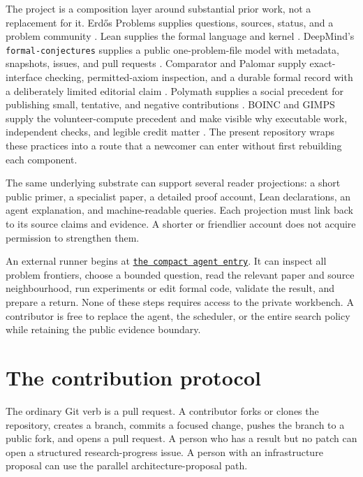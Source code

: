 \documentclass[10pt]{article}
\newcommand{\repobase}{https://github.com/wcook04/plectis-lean-erdos249-257}
\newcommand{\repolink}[2]{\href{\repobase/blob/ca0e13f8acf5ccf48506e4bdb870953d3a0856fa/#1}{\texttt{#2}}}
\begin{document}
The project is a composition layer around substantial prior work, not a
replacement for it.  Erd\H{o}s Problems supplies questions, sources, status,
and a problem community \cite{erdosproblems}.  Lean supplies the formal
language and kernel \cite{lean4}.  DeepMind's
\texttt{formal-conjectures} supplies a public one-problem-file model with
metadata, snapshots, issues, and pull requests \cite{formalconjectures}.
Comparator and Palomar supply exact-interface checking, permitted-axiom
inspection, and a durable formal record with a deliberately limited editorial
claim \cite{palomar}.  Polymath supplies a social precedent for publishing
small, tentative, and negative contributions \cite{polymath}.  BOINC and GIMPS
supply the volunteer-compute precedent and make visible why executable work,
independent checks, and legible credit matter \cite{boinc,gimps}.  The present
repository wraps these practices into a route that a newcomer can enter
without first rebuilding each component.

The same underlying substrate can support several reader projections: a short
public primer, a specialist paper, a detailed proof account, Lean declarations,
an agent explanation, and machine-readable queries.  Each projection must link
back to its source claims and evidence.  A shorter or friendlier account does
not acquire permission to strengthen them.

An external runner begins at \repolink{AGENTS.override.md}{the compact agent
entry}.  It can inspect all problem frontiers, choose a bounded question, read
the relevant paper and source neighbourhood, run experiments or edit formal
code, validate the result, and prepare a return.  None of these steps requires
access to the private workbench.  A contributor is free to replace the agent,
the scheduler, or the entire search policy while retaining the public evidence
boundary.

\section{The contribution protocol}\label{sec:protocol}

The ordinary Git verb is a pull request.  A contributor forks or clones the
repository, creates a branch, commits a focused change, pushes the branch to a
public fork, and opens a pull request.  A person who has a result but no patch
can open a structured research-progress issue.  A person with an
infrastructure proposal can use the parallel architecture-proposal path.
\end{document}
